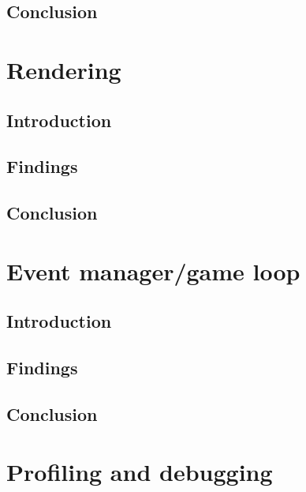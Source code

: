 \documentclass{projdoc}
\begin{document}
\subsection{Conclusion}

\section{Rendering}

\subsection{Introduction}

\subsection{Findings}

\subsection{Conclusion}

\section{Event manager/game loop}

\subsection{Introduction}

\subsection{Findings}

\subsection{Conclusion}

\section{Profiling and debugging}


\end{document}
